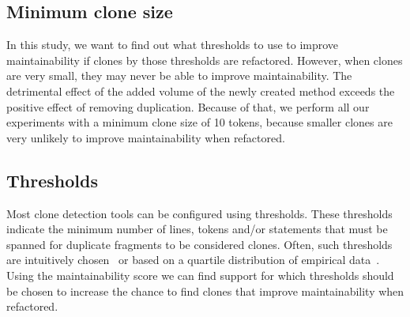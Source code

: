 \documentclass[sigconf,review, table]{acmart}
\begin{document}
\subsection{Minimum clone size}
In this study, we want to find out what thresholds to use to improve maintainability if clones by those thresholds are refactored. However, when clones are very small, they may never be able to improve maintainability. The detrimental effect of the added volume of the newly created method exceeds the positive effect of removing duplication. Because of that, we perform all our experiments with a minimum clone size of 10 tokens, because smaller clones are very unlikely to improve maintainability when refactored.

\subsection{Thresholds}
Most clone detection tools can be configured using thresholds. These thresholds indicate the minimum number of lines, tokens and/or statements that must be spanned for duplicate fragments to be considered clones. Often, such thresholds are intuitively chosen~\cite{li2006cp, roy2009mutation} or based on a quartile distribution of empirical data~\cite{alves2010deriving}. Using the maintainability score we can find support for which thresholds should be chosen to increase the chance to find clones that improve maintainability when refactored.


\end{document}
